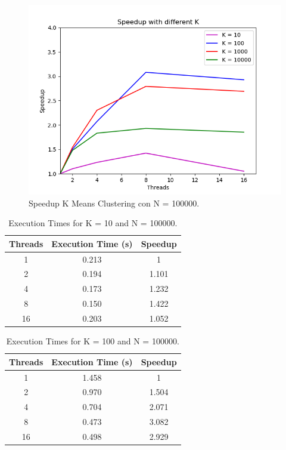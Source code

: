 \documentclass[10pt,twocolumn,letterpaper]{article}
\begin{document}
\begin{figure}[H]
	\includegraphics[width=\linewidth]{images/speedup_by_k.png}
	\caption{Speedup K Means Clustering con N = 100000.}
	\label{fig:speedup_k}
\end{figure}

\begin{table}[H]
	\begin{center}
		\begin{tabular}{|c|c|c|}
			\hline
			Threads & Execution Time (s) & Speedup \\
			\hline
			1 & 0.213 & 1 \\ 
			2 & 0.194 & 1.101 \\
			4 & 0.173 & 1.232 \\
			8 & 0.150 & 1.422 \\ 
			16 & 0.203 & 1.052 \\
			\hline
		\end{tabular}
	\end{center}
	\caption{Execution Times for K = 10 and N = 100000.}
	\label{tab:speedup_k_n_1}
\end{table}

\begin{table}[H]
	\begin{center}
		\begin{tabular}{|c|c|c|}
			\hline
			Threads & Execution Time (s) & Speedup \\
			\hline
			1 & 1.458 & 1 \\ 
			2 & 0.970 & 1.504 \\
			4 & 0.704 & 2.071 \\
			8 & 0.473 & 3.082 \\ 
			16 & 0.498 & 2.929 \\
			\hline
		\end{tabular}
	\end{center}
	\caption{Execution Times for K = 100 and N = 100000.}
	\label{tab:speedup_k_n_2}
\end{table}
\end{document}
